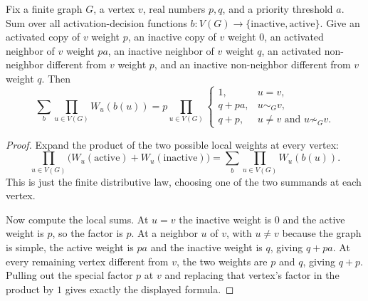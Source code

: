 \begin{helper}
Fix a finite graph $G$, a vertex $v$, real numbers $p,q$, and a priority
threshold $a$.  Sum over all activation-decision functions
$b:V(G)\to\{\mathrm{inactive},\mathrm{active}\}$.  Give an activated copy of
$v$ weight $p$, an inactive copy of $v$ weight $0$, an activated neighbor of
$v$ weight $pa$, an inactive neighbor of $v$ weight $q$, an activated
non-neighbor different from $v$ weight $p$, and an inactive non-neighbor
different from $v$ weight $q$.  Then
\[
\sum_b\prod_{u\in V(G)} W_u(b(u))
=
p\prod_{u\in V(G)}
\begin{cases}
1, & u=v,\\
q+pa, & u\sim_G v,\\
q+p, & u\ne v\text{ and }u\not\sim_G v.
\end{cases}
\]
\end{helper}
\begin{proof}
Expand the product of the two possible local weights at every vertex:
\[
\prod_{u\in V(G)}\bigl(W_u(\mathrm{active})+
W_u(\mathrm{inactive})\bigr)
=\sum_b\prod_{u\in V(G)}W_u(b(u)).
\]
This is just the finite distributive law, choosing one of the two summands at
each vertex.

Now compute the local sums.  At $u=v$ the inactive weight is $0$ and the
active weight is $p$, so the factor is $p$.  At a neighbor $u$ of $v$, with
$u\ne v$ because the graph is simple, the active weight is $pa$ and the
inactive weight is $q$, giving $q+pa$.  At every remaining vertex different
from $v$, the two weights are $p$ and $q$, giving $q+p$.  Pulling out the
special factor $p$ at $v$ and replacing that vertex's factor in the product by
$1$ gives exactly the displayed formula.
\end{proof}
